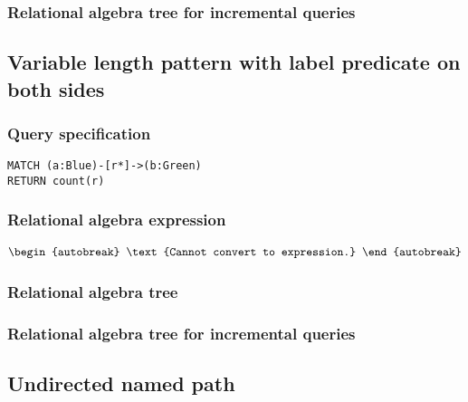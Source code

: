 
\subsubsection*{Relational algebra tree for incremental queries}


\subsection{Variable length pattern with label predicate on both sides}

\subsubsection*{Query specification}

\begin{lstlisting}
MATCH (a:Blue)-[r*]->(b:Green)
RETURN count(r)
\end{lstlisting}

\subsubsection*{Relational algebra expression}

\begin{align*}
\begin{autobreak}
\text{Cannot convert to expression.}
\end{autobreak}
\end{align*}

\subsubsection*{Relational algebra tree}


\subsubsection*{Relational algebra tree for incremental queries}


\subsection{Undirected named path}

